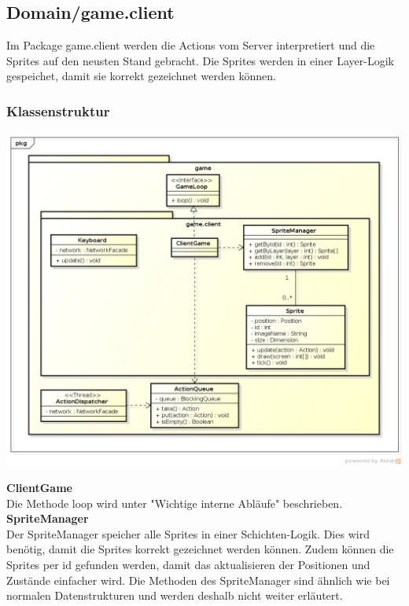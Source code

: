 \documentclass[11pt]{scrartcl}
\begin{document}
\newpage
\subsection{Domain/game.client}
Im Package game.client werden die Actions vom Server interpretiert und die Sprites auf den neusten Stand gebracht. Die Sprites werden in einer Layer-Logik gespeichet, damit sie korrekt gezeichnet werden können.

\subsubsection{Klassenstruktur}
\includegraphics[scale=0.5]{ClassDiagramGameClient}

\textbf{ClientGame}\\
Die Methode loop wird unter "Wichtige interne Abläufe" beschrieben.\\

\textbf{SpriteManager}\\
Der SpriteManager speicher alle Sprites in einer Schichten-Logik. Dies wird benötig, damit die Sprites korrekt gezeichnet werden können. Zudem können die Sprites per id gefunden werden, damit das aktualisieren der Positionen und Zustände einfacher wird. Die Methoden des SpriteManager sind ähnlich wie bei normalen Datenstrukturen und werden deshalb nicht weiter erläutert.

\newpage
\end{document}
